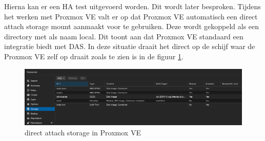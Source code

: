 Hierna kan er een HA test uitgevoerd worden. Dit wordt later besproken.
Tijdens het werken met Proxmox VE valt er op dat Proxmox VE automatisch een direct attach storage mount aanmaakt voor te gebruiken. Deze wordt gekoppeld als een directory met als naam local.
Dit toont aan dat Proxmox VE standaard een integratie biedt met DAS. In deze situatie draait het direct op de schijf waar de Proxmox VE zelf op draait zoals te zien is in de figuur \ref{fig:das-prox}.
\begin{figure}[H]
  \centering
  \includegraphics[width=1.1\textwidth]{../poc/das-proxmox.png}
  \caption{direct attach storage in Proxmox VE}
  \label{fig:das-prox}
\end{figure}


